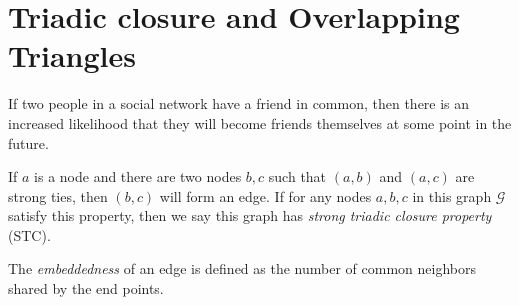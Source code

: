 \section{Triadic closure and Overlapping Triangles}
\begin{intuition}
	If two people in a social network have a friend in common, then there is an increased likelihood
	that they will become friends themselves at some point in the future.
\end{intuition}

\begin{definition}
	If \(a\) is a node and there are two nodes \(b, c\) such that \((a, b)\) and \((a, c)\) are strong ties, then \((b, c)\) will form an edge.
	If for any nodes \(a, b, c\) in this graph \(\mathcal{G}\) satisfy this property, then we say this graph has \emph{strong triadic closure property} (STC).
\end{definition}

\begin{definition}[Embeddedness]
	The \emph{embeddedness} of an edge is defined as the number of common neighbors shared by the end points.
\end{definition}


